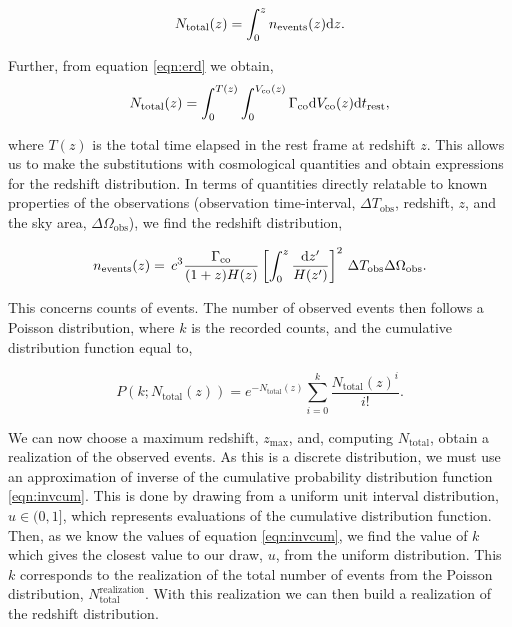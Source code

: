 \begin{equation}\label{eqn:total_dist}
N_{\mathrm{total}}(z) = \int_0^{z} n_{\mathrm{events}}(z) \mathrm{d} z.
\end{equation}\par
Further, from equation \ref{eqn:erd} we obtain,
\begin{equation}
N_{\mathrm{ total}}(z) = \int_0^{T (z)} \int_0^{V_{\mathrm{co}}(z)}  \Gamma_{\mathrm{co}} \mathrm{d} V_{\mathrm{co}}(z)\mathrm{d} t_{\mathrm{rest}},
\end{equation}\par

where $T(z)$ is the total time elapsed in the rest frame at redshift $z$. This allows us to make the substitutions with cosmological quantities and obtain expressions for the redshift distribution. In terms of quantities directly relatable to known properties of the observations (observation time-interval, $\Delta T_{\mathrm{obs}}$, redshift, $z$, and the sky area, $\Delta \Omega_{\mathrm{obs}}$), we find the redshift distribution,\par

\begin{align}\label{eqn:reddist}
n_{\mathrm{events}}(z) = \, c^3  \frac{\Gamma_{\mathrm{co}}}{(1+z)H(z)} \left[\int^{z}_0 \frac{\mathrm{d} z'}{H(z')} \right]^2 \, \Delta T_{\mathrm{obs}} \Delta \Omega_{\mathrm{obs}}.
\end{align}\par

This concerns counts of events. The number of observed events then follows a Poisson distribution, where $k$ is the recorded counts, and the cumulative distribution function equal to,

\begin{equation}\label{eqn:invcum}
P(k;N_{\mathrm{total}}(z)) =e^{-N_{\mathrm{ total}}(z)} \sum_{i=0}^k \frac{N_{\mathrm{ total}}(z)^i}{i!}.
\end{equation}\par

We can now choose a maximum redshift, $z_{\mathrm{max}}$, and, computing $N_{\mathrm{ total}}$, obtain a realization of the observed events. As this is a discrete distribution, we must use an approximation of inverse of the cumulative probability distribution function \ref{eqn:invcum}. This is done by drawing from a uniform unit interval distribution, $u\in(0,1]$, which represents evaluations of the cumulative distribution function. Then, as we know the values of equation \ref{eqn:invcum}, we find the value of $k$ which gives the closest value to our draw, $u$, from the uniform distribution. This $k$ corresponds to the realization of the total number of events from the Poisson distribution, $N_{\mathrm{ total}}^{\mathrm{realization}}$. With this realization we can then build a realization of the redshift distribution.\par

